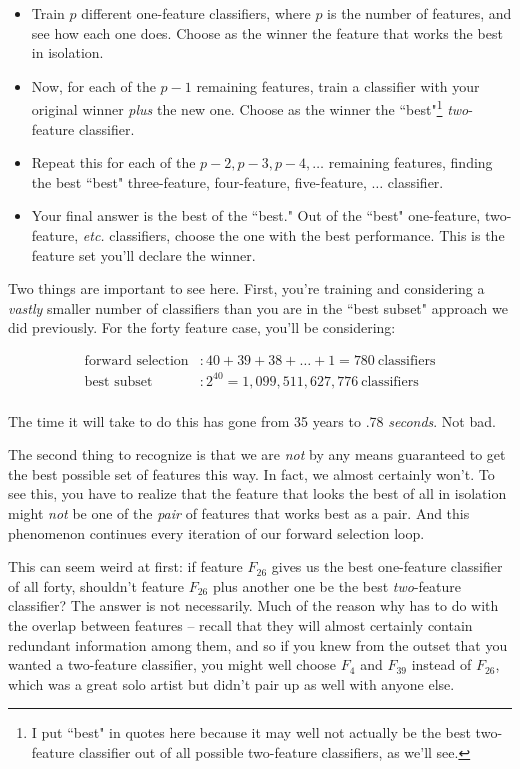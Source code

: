 \documentclass[12pt]{article}
\begin{document}
\begin{itemize}
\itemsep.1em
\item Train $p$ different one-feature classifiers, where $p$ is the number of
features, and see how each one does. Choose as the winner the feature that
works the best in isolation.
\item Now, for each of the $p-1$ remaining features, train a classifier with
your original winner \textit{plus} the new one. Choose as the winner the
``best"\footnote{I put ``best" in quotes here because it may well not actually
be the best two-feature classifier out of all possible two-feature
classifiers, as we'll see.} \textit{two}-feature classifier.
\item Repeat this for each of the $p-2, p-3, p-4, \dots$ remaining features,
finding the best ``best" three-feature, four-feature, five-feature, $\dots$
classifier.
\item Your final answer is the best of the ``best." Out of the ``best"
one-feature, two-feature, \textit{etc.} classifiers, choose the one with the
best performance. This is the feature set you'll declare the winner.
\end{itemize}

Two things are important to see here. First, you're training and considering a
\textit{vastly} smaller number of classifiers than you are in the ``best
subset" approach we did previously. For the forty feature case, you'll be
considering:

\begin{align*}
\textrm{forward selection}&: 40 + 39 + 38 + \dots + 1 = 780\ \textrm{classifiers}\\
\textrm{best subset}&: 2^{40} = 1,099,511,627,776\ \textrm{classifiers}\\
\end{align*}

The time it will take to do this has gone from 35 years to .78
\textit{seconds}. Not bad.

The second thing to recognize is that we are \textit{not} by any means
guaranteed to get the best possible set of features this way. In fact, we
almost certainly won't. To see this, you have to realize that the feature that
looks the best of all in isolation might \textit{not} be one of the
\textit{pair} of features that works best as a pair. And this phenomenon
continues every iteration of our forward selection loop.

This can seem weird at first: if feature $F_{26}$ gives us the best
one-feature classifier of all forty, shouldn't feature $F_{26}$ plus another
one be the best \textit{two}-feature classifier? The answer is not
necessarily. Much of the reason why has to do with the overlap between
features -- recall that they will almost certainly contain redundant
information among them, and so if you knew from the outset that you wanted a
two-feature classifier, you might well choose $F_4$ and $F_{39}$ instead of
$F_{26}$, which was a great solo artist but didn't pair up as well with anyone
else.
\end{document}
